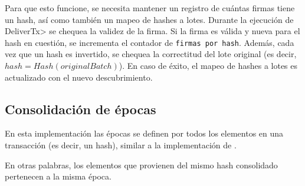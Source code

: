 Para que esto funcione, se necesita mantener un registro de cuántas firmas tiene un hash,
así como también un mapeo de hashes a lotes.
%
Durante la ejecución de \<DeliverTx> se chequea la validez de la firma.
%
Si la firma es válida y nueva para el hash en cuestión, se incrementa el contador de
\texttt{firmas por hash}.
%
Además, cada vez que un hash es invertido, se chequea la correctitud del lote original
(es decir, $hash = Hash(originalBatch)$). En caso de éxito, el mapeo de hashes a lotes
es actualizado con el nuevo descubrimiento.

%


%




\subsection{Consolidación de épocas}\label{subsubsec:consolidation}

En esta implementación las épocas se definen por todos los elementos en una transacción
(es decir, un hash), similar
a la implementación de \compresschain.

%
En otras palabras, los elementos que provienen del mismo hash consolidado pertenecen a la
misma época.

%
%

